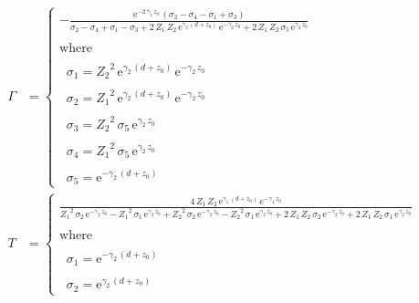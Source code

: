 \documentclass{article}
\begin{document}
\begin{align*}
    \Gamma &= \left\{\begin{array}{l}
        -\frac{{\mathrm{e}}^{-2\,\gamma_1 \,z_0 } \,{\left(\sigma_2 -\sigma_4 -\sigma_1 +\sigma_3 \right)}}{\sigma_2 -\sigma_4 +\sigma_1 -\sigma_3 +2\,Z_1 \,Z_2 \,{\mathrm{e}}^{\gamma_2 \,{\left(d+z_0 \right)}} \,{\mathrm{e}}^{-\gamma_2 \,z_0 } +2\,Z_1 \,Z_2 \,\sigma_5 \,{\mathrm{e}}^{\gamma_2 \,z_0 } }\\
        \mathrm{}\\
        \textrm{where}\\
        \mathrm{}\\
        \;\;\sigma_1 ={Z_2 }^2 \,{\mathrm{e}}^{\gamma_2 \,{\left(d+z_0 \right)}} \,{\mathrm{e}}^{-\gamma_2 \,z_0 } \\
        \mathrm{}\\
        \;\;\sigma_2 ={Z_1 }^2 \,{\mathrm{e}}^{\gamma_2 \,{\left(d+z_0 \right)}} \,{\mathrm{e}}^{-\gamma_2 \,z_0 } \\
        \mathrm{}\\
        \;\;\sigma_3 ={Z_2 }^2 \,\sigma_5 \,{\mathrm{e}}^{\gamma_2 \,z_0 } \\
        \mathrm{}\\
        \;\;\sigma_4 ={Z_1 }^2 \,\sigma_5 \,{\mathrm{e}}^{\gamma_2 \,z_0 } \\
        \mathrm{}\\
        \;\;\sigma_5 ={\mathrm{e}}^{-\gamma_2 \,{\left(d+z_0 \right)}} 
        \end{array}\right.\\
    T &= \left\{\begin{array}{l}
        \frac{4\,Z_1 \,Z_2 \,{\mathrm{e}}^{\gamma_1 \,{\left(d+z_0 \right)}} \,{\mathrm{e}}^{-\gamma_1 \,z_0 } }{{Z_1 }^2 \,\sigma_2 \,{\mathrm{e}}^{-\gamma_2 \,z_0 } -{Z_1 }^2 \,\sigma_1 \,{\mathrm{e}}^{\gamma_2 \,z_0 } +{Z_2 }^2 \,\sigma_2 \,{\mathrm{e}}^{-\gamma_2 \,z_0 } -{Z_2 }^2 \,\sigma_1 \,{\mathrm{e}}^{\gamma_2 \,z_0 } +2\,Z_1 \,Z_2 \,\sigma_2 \,{\mathrm{e}}^{-\gamma_2 \,z_0 } +2\,Z_1 \,Z_2 \,\sigma_1 \,{\mathrm{e}}^{\gamma_2 \,z_0 } }\\
        \mathrm{}\\
        \textrm{where}\\
        \mathrm{}\\
        \;\;\sigma_1 ={\mathrm{e}}^{-\gamma_2 \,{\left(d+z_0 \right)}} \\
        \mathrm{}\\
        \;\;\sigma_2 ={\mathrm{e}}^{\gamma_2 \,{\left(d+z_0 \right)}} 
        \end{array}\right.
\end{align*}
\end{document}
